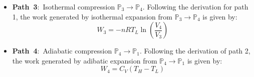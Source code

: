 \documentclass[11pt]{article}
\theoremstyle{definition}
\begin{document}
\begin{itemize}
\item{\textbf{Path~3}:~Isothermal compression $\mathbb{P}_{3}\rightarrow\mathbb{P}_{4}$.
Following the derivation for path 1, the work generated by isothermal expansion from $\mathbb{P}_{3}\rightarrow\mathbb{P}_{4}$ is given by:
\begin{equation}
W_{3} = - nRT_{L}\ln\left(\frac{V_{4}}{V_{3}}\right)
\end{equation}}

\item{\textbf{Path~4}:~Adiabatic compression $\mathbb{P}_{4}\rightarrow\mathbb{P}_{1}$.
Following the derivation of path 2, the work generated by adibatic expansion from $\mathbb{P}_{4}\rightarrow\mathbb{P}_{1}$ is given by:
\begin{equation}
W_{4} = C_{V}\left(T_{H} - T_{L}\right)
\end{equation}}
\end{itemize}
\end{document}
